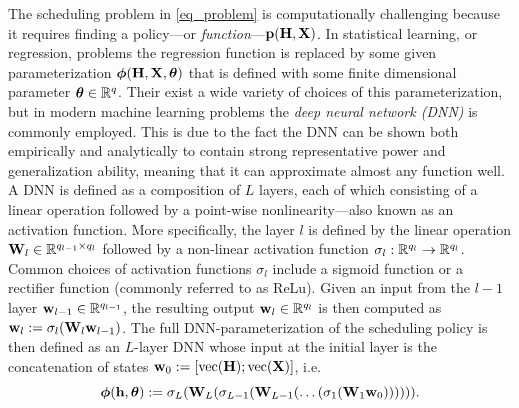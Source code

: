 \documentclass[conference,10pt]{IEEEtran}
\def\vec2{\text{vec}}
\begin{document}
The scheduling problem in \eqref{eq_problem} is computationally challenging because it requires finding a policy---or \emph{function}---${\mathbf p}({\mathbf H},{\mathbf X})$. In statistical learning, or regression, problems the regression function is replaced by some given parameterization $\boldsymbol{\phi}({\mathbf H},{\mathbf X},\boldsymbol{\theta})$ that is defined with some finite dimensional parameter $\boldsymbol{\theta} \in {\mathbb R}^q$. Their exist a wide variety of choices of this parameterization, but in modern machine learning problems the \emph{deep neural network (DNN)} is commonly employed. This is due to the fact the DNN can be shown both empirically and analytically to contain strong representative power and generalization ability, meaning that it can approximate almost any function well. A DNN is defined as a composition of $L$ layers, each of which consisting of a linear operation followed by a point-wise nonlinearity---also known as an activation function.  More specifically, the layer $l$ is defined by the linear operation ${\mathbf W}_l \in {\mathbb R}^{q_{l-1} \times q_l}$ followed by a non-linear activation function $\mathbb{\sigma}_{l}: {\mathbb R}^{q_l} \rightarrow {\mathbb R}^{q_l}$. Common choices of activation functions $\mathbb{\sigma}_{l}$ include a sigmoid function or a rectifier function (commonly referred to as ReLu). Given an input from the $l-1$ layer ${\mathbf w}_{l-1} \in {\mathbb R}^{q_{l-1}}$, the resulting output ${\mathbf w}_{l} \in {\mathbb R}^{q_l}$ is then computed as ${\mathbf w}_l := \mathbb{\sigma}_{l}({\mathbf W}_l {\mathbf w}_{l-1})$.  The full DNN-parameterization of the scheduling policy is then defined as an $L$-layer DNN whose input at the initial layer is the concatenation of states $\bbw_0 := [\vec2(\bbH); \vec2(\bbX)]$, i.e.
%
\begin{equation}\label{eq_policy_dnn}
\bbphi(\bbh,\bbtheta) := \mathbb{\sigma}_{L}(\bbW_{L} (\mathbb{\sigma}_{L-1}(\bbW_{L-1}(\hdots(\mathbb{\sigma}_{1}(\bbW_{1}\bbw_0)))))).
\end{equation}
%
\end{document}
